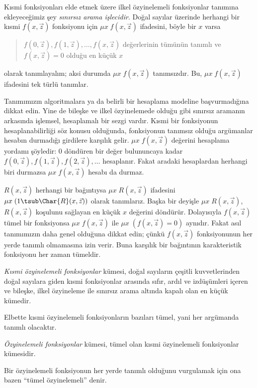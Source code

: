 \documentclass[../../../include/open-logic-section]{subfiles}
\begin{document}
Kısmi fonksiyonları elde etmek üzere ilkel özyinelemeli fonksiyonlar tanımına
ekleyeceğimiz şey \emph{sınırsız arama işlecidir}. Doğal sayılar üzerinde
herhangi bir kısmi $f(x,\vec z)$ fonksiyonu için $\mu x\;f(x,\vec z)$
ifadesini, böyle bir $x$ varsa
\begin{quote}
  $f(0,\vec z),f(1,\vec z),\dots,f(x,\vec z)$ değerlerinin tümünün tanımlı
  ve $f(x,\vec z)=0$ olduğu en küçük $x$
\end{quote}
olarak tanımlayalım; aksi durumda $\mu x\;f(x,\vec z)$ tanımsızdır. Bu,
$\mu x\;f(x,\vec z)$ ifadesini tek türlü tanımlar.

\begin{explain}
Tanımımızın  algoritmalara ya da belirli
bir hesaplama modeline başvurmadığına dikkat edin. Yine de bileşke ve ilkel
özyinelemede olduğu gibi sınırsız aramanın arkasında işlemsel, hesaplamalı bir
sezgi vardır. Kısmi bir fonksiyonun hesaplanabilirliği söz konusu olduğunda,
fonksiyonun tanımsız olduğu argümanlar hesabın durmadığı girdilere karşılık
gelir. $\mu x\;f(x,\vec z)$ değerini hesaplama yordamı şöyledir:
$0$ döndüren bir değer bulununcaya kadar
$f(0,\vec z),f(1,\vec z),f(2,\vec z),\dots$ hesaplanır. Fakat aradaki
hesaplardan herhangi biri durmazsa $\mu x\;f(x,\vec z)$ hesabı da durmaz.
\end{explain}

$R(x,\vec z)$ herhangi bir bağıntıysa $\mu x\;R(x,\vec z)$ ifadesini
$\mu x\;(1\tsub\Char{R}(x,\vec z))$ olarak tanımlarız. Başka bir deyişle
$\mu x\;R(x,\vec z)$, $R(x,\vec z)$ koşulunu sağlayan en küçük $x$ değerini
döndürür. Dolayısıyla $f(x,\vec z)$ tümel bir fonksiyonsa
$\mu x\;f(x,\vec z)$ ile $\mu x\;(f(x,\vec z)=0)$ aynıdır. Fakat asıl
tanımımızın daha genel olduğuna dikkat edin; çünkü $f(x,\vec z)$ fonksiyonunun
her yerde tanımlı olmamasına izin verir. Buna karşılık bir bağıntının
karakteristik fonksiyonu her zaman tümeldir.

\begin{defn}
\emph{Kısmi özyinelemeli fonksiyonlar} kümesi, doğal sayıların çeşitli
kuvvetlerinden doğal sayılara giden kısmi fonksiyonlar arasında sıfır, ardıl
ve izdüşümleri içeren ve bileşke, ilkel özyineleme ile sınırsız arama altında
kapalı olan en küçük kümedir.
\end{defn}

Elbette kısmi özyinelemeli fonksiyonların bazıları tümel, yani her argümanda
tanımlı olacaktır.

\begin{defn}
\emph{Özyinelemeli fonksiyonlar} kümesi, tümel olan kısmi özyinelemeli
fonksiyonlar kümesidir.
\end{defn}

Bir özyinelemeli fonksiyonun her yerde tanımlı olduğunu vurgulamak için ona
bazen ``tümel özyinelemeli'' denir.
\end{document}
